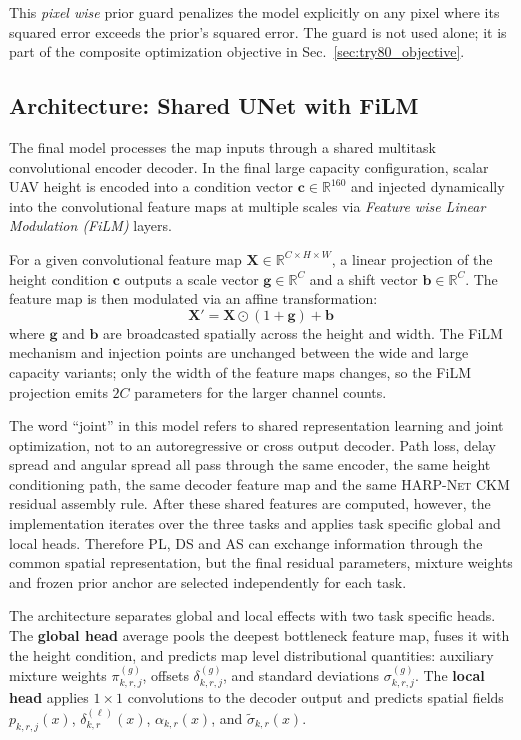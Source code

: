 This \emph{pixel wise} prior guard penalizes the model explicitly on any pixel
where its squared error exceeds the prior's squared error. The guard is not
used alone; it is part of the composite optimization objective in
Sec.~\ref{sec:try80_objective}.

\subsection{Architecture: Shared UNet with FiLM}

The final model processes the map inputs through a shared multitask
convolutional encoder decoder. In the final large capacity configuration,
scalar UAV height is encoded into a condition vector
$\textbf{c} \in \mathbb{R}^{160}$ and injected dynamically into the
convolutional feature maps at multiple scales via
\emph{Feature wise Linear Modulation (FiLM)} layers.

For a given convolutional feature map $\textbf{X} \in \mathbb{R}^{C \times H \times W}$, a linear projection of the height condition $\textbf{c}$ outputs a scale vector $\textbf{g} \in \mathbb{R}^C$ and a shift vector $\textbf{b} \in \mathbb{R}^C$. The feature map is then modulated via an affine transformation:
\begin{equation}
\textbf{X}' = \textbf{X} \odot (1 + \textbf{g}) + \textbf{b}
\label{eq:film}
\end{equation}
where $\textbf{g}$ and $\textbf{b}$ are broadcasted spatially across the height and width.
The FiLM mechanism and injection points are unchanged between the wide and
large capacity variants; only the width of the feature maps changes, so the
FiLM projection emits \(2C\) parameters for the larger channel counts.

The word ``joint'' in this model refers to shared representation learning and
joint optimization, not to an autoregressive or cross output decoder. Path loss,
delay spread and angular spread all pass through the same encoder, the same
height conditioning path, the same decoder feature map and the same
\textsc{HARP-Net CKM} residual assembly rule. After these shared features are computed,
however, the implementation iterates over the three tasks and applies
task specific global and local heads. Therefore PL, DS and AS can exchange
information through the common spatial representation, but the final residual
parameters, mixture weights and frozen prior anchor are selected independently
for each task.

The architecture separates global and local effects with two task specific
heads. The \textbf{global head} average pools the deepest bottleneck feature
map, fuses it with the height condition, and predicts map level distributional
quantities: auxiliary mixture weights \(\pi^{(g)}_{k,r,j}\), offsets
\(\delta^{(g)}_{k,r,j}\), and standard deviations \(\sigma^{(g)}_{k,r,j}\).
The \textbf{local head} applies \(1\times1\) convolutions to the decoder output
and predicts spatial fields \(p_{k,r,j}(x)\), \(\delta^{(\ell)}_{k,r}(x)\),
\(\alpha_{k,r}(x)\), and \(\tilde\sigma_{k,r}(x)\).

